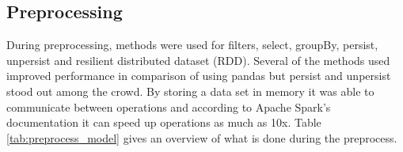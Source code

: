 \documentclass[../main.tex]{subfiles}
\begin{document}
\begin{table}[H]
\centering
{}
\caption{Which form of analysis that were used for the project.}
\label{tab:analysis}
\end{table}

\subsection{Preprocessing}
During preprocessing, methods were used for filters, select, groupBy, persist, unpersist and  resilient distributed dataset (RDD). Several of the methods used improved performance in comparison of using pandas but persist and unpersist stood out among the crowd. By storing a data set in memory it was able to communicate between operations and according to Apache Spark's documentation it can speed up operations as much as 10x. Table \ref{tab:preprocess_model} gives an overview of what is done during the preprocess.
\end{document}
